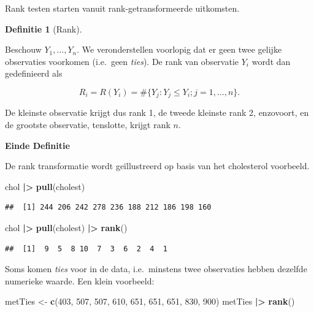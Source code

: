 \documentclass[
  12pt,dutch]{book}
\newenvironment{Shaded}{\begin{snugshade}}{\end{snugshade}}
\newcommand{\DecValTok}[1]{\textcolor[rgb]{0.00,0.00,0.81}{#1}}
\newcommand{\FunctionTok}[1]{\textcolor[rgb]{0.13,0.29,0.53}{\textbf{#1}}}
\newcommand{\NormalTok}[1]{#1}
\newcommand{\OtherTok}[1]{\textcolor[rgb]{0.56,0.35,0.01}{#1}}
\newcommand{\SpecialCharTok}[1]{\textcolor[rgb]{0.81,0.36,0.00}{\textbf{#1}}}
\theoremstyle{definition}
\newtheorem{definition}{Definitie}[chapter]
\theoremstyle{definition}
\theoremstyle{definition}
\theoremstyle{definition}
\theoremstyle{remark}
\begin{document}
Rank testen starten vanuit rank-getransformeerde uitkomsten.

\begin{definition}[Rank]
\protect\hypertarget{def:unnamed-chunk-207}{}\label{def:unnamed-chunk-207}~
\end{definition}

Beschouw \(Y_1, \ldots, Y_n\). We veronderstellen voorlopig dat
er geen twee gelijke observaties voorkomen (i.e.~geen \emph{ties}).
De rank van observatie \(Y_i\) wordt dan
gedefinieerd als

\begin{equation*}
  R_i=R(Y_i) = \#\{Y_j: Y_j\leq Y_i; j=1,\ldots, n\}.
\end{equation*}

De kleinste observatie krijgt dus rank 1, de tweede kleinste rank 2, enzovoort, en de grootste observatie,
tenslotte, krijgt rank \(n\).

\textbf{Einde Definitie}

De rank transformatie wordt geïllustreerd op basis van het cholesterol voorbeeld.

\begin{Shaded}
\begin{Highlighting}[]
\NormalTok{chol }\SpecialCharTok{|\textgreater{}}
    \FunctionTok{pull}\NormalTok{(cholest)}
\end{Highlighting}
\end{Shaded}

\begin{verbatim}
##  [1] 244 206 242 278 236 188 212 186 198 160
\end{verbatim}

\begin{Shaded}
\begin{Highlighting}[]
\NormalTok{chol }\SpecialCharTok{|\textgreater{}}
    \FunctionTok{pull}\NormalTok{(cholest) }\SpecialCharTok{|\textgreater{}}
    \FunctionTok{rank}\NormalTok{()}
\end{Highlighting}
\end{Shaded}

\begin{verbatim}
##  [1]  9  5  8 10  7  3  6  2  4  1
\end{verbatim}

Soms komen \emph{ties} voor in de data, i.e.~minstens twee observaties hebben dezelfde numerieke waarde. Een klein voorbeeld:

\begin{Shaded}
\begin{Highlighting}[]
\NormalTok{metTies }\OtherTok{\textless{}{-}} \FunctionTok{c}\NormalTok{(}\DecValTok{403}\NormalTok{, }\DecValTok{507}\NormalTok{, }\DecValTok{507}\NormalTok{, }\DecValTok{610}\NormalTok{, }\DecValTok{651}\NormalTok{, }\DecValTok{651}\NormalTok{, }\DecValTok{651}\NormalTok{, }\DecValTok{830}\NormalTok{,}
    \DecValTok{900}\NormalTok{)}
\NormalTok{metTies }\SpecialCharTok{|\textgreater{}}
    \FunctionTok{rank}\NormalTok{()}
\end{Highlighting}
\end{Shaded}
\end{document}
